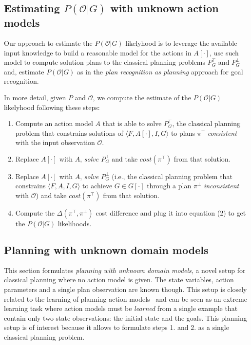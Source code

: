 \documentclass[letterpaper]{article} %
\newcommand{\tup}[1]{{\langle #1 \rangle}}
\begin{document}
\subsection{Estimating $P(\mathcal{O}|G)$ with unknown action models}
Our approach to estimate the $P(\mathcal{O}|G)$ likelyhood is to leverage the available input knowledge to build a reasonable model for the actions in $A[\cdot]$, use such model to compute solution plans to the classical planning problems $P^{\top}_G$ and $P^{\bot}_G$ and, estimate $P(\mathcal{O}|G)$ as in the {\em plan recognition as planning} approach for goal recognition.

In more detail, given $P$ and $\mathcal{O}$, we compute the estimate of the $P(\mathcal{O}|G)$ likelyhood following these steps:
\begin{enumerate}
\item Compute an action model $A$ that is able to solve {\em $P^{\top}_G$}, the classical planning problem that constrains solutions of $\tup{F,A[\cdot],I,G}$ to plans $\pi^\top$ {\em consistent} with the input observation $\mathcal{O}$. 
\item Replace $A[\cdot]$ with $A$, {\em solve $P^{\top}_G$} and take $cost(\pi^\top)$ from that solution.
\item Replace $A[\cdot]$ with $A$, {\em solve $P^{\bot}_G$} (i.e., the classical planning problem that constrains $\tup{F,A,I,G}$ to achieve $G\in G[\cdot]$ through a plan $\pi^\bot$ {\em inconsistent} with $\mathcal{O}$) and take $cost(\pi^\top)$ from that solution.
\item Compute the $\Delta(\pi^\top,\pi^\bot)$ cost difference and plug it into equation (2) to get the $P(\mathcal{O}|G)$ likelihoods.
\end{enumerate}

\subsection{Planning with unknown domain models}
This section formulates {\em planning with unknown domain models}, a novel setup for classical planning where no action model is given. The state variables, action parameters and a single plan observation are known though. This setup is closely related to the learning of planning action models~\cite{SternJ17} and can be seen as an extreme learning task where action models must be {\em learned} from a single example that contain only two state observations: the initial state and the goals. This planning setup is of interest because it allows to formulate steps 1. and 2. as a single classical planning problem.
\end{document}
